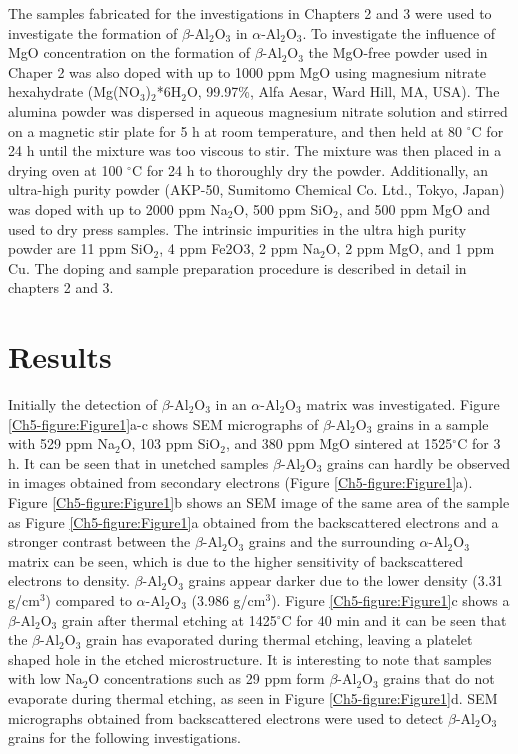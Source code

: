 The samples fabricated for the investigations in Chapters 2 and 3 were used to investigate the formation of $\beta$-Al$_{2}$O$_{3}$ in $\alpha$-Al$_{2}$O$_{3}$. To investigate the influence of MgO concentration on the formation of $\beta$-Al$_{2}$O$_{3}$ the MgO-free powder used in Chaper 2 was also doped with up to 1000 ppm MgO using magnesium nitrate hexahydrate (Mg(NO$_{3}$)$_{2}$*6H$_{2}$O, 99.97\%, Alfa Aesar, Ward Hill, MA, USA). The alumina powder was dispersed in aqueous magnesium nitrate solution and stirred on a magnetic stir plate for 5 h at room temperature, and then held at 80 $^{\circ}$C for 24 h until the mixture was too viscous to stir. The mixture was then placed in a drying oven at 100 $^{\circ}$C for 24 h to thoroughly dry the powder. Additionally, an ultra-high purity powder (AKP-50, Sumitomo Chemical Co. Ltd., Tokyo, Japan) was doped with up to 2000 ppm Na$_{2}$O, 500 ppm SiO$_{2}$, and 500 ppm MgO and used to dry press samples. The intrinsic impurities in the ultra high purity powder are 11 ppm SiO$_{2}$, 4 ppm Fe2O3, 2 ppm Na$_{2}$O, 2 ppm MgO, and 1 ppm Cu. The doping and sample preparation procedure is described in detail in chapters 2 and 3.

\section{Results}

Initially the detection of $\beta$-Al$_{2}$O$_{3}$ in an $\alpha$-Al$_{2}$O$_{3}$ matrix was investigated. Figure \ref{Ch5-figure:Figure1}a-c shows SEM micrographs of $\beta$-Al$_{2}$O$_{3}$ grains in a sample with 529 ppm Na$_{2}$O, 103 ppm SiO$_{2}$, and 380 ppm MgO sintered at 1525$^{\circ}$C for 3 h. It can be seen that in unetched samples $\beta$-Al$_{2}$O$_{3}$ grains can hardly be observed in images obtained from secondary electrons (Figure \ref{Ch5-figure:Figure1}a). Figure \ref{Ch5-figure:Figure1}b shows an SEM image of the same area of the sample as Figure \ref{Ch5-figure:Figure1}a obtained from the backscattered electrons and a stronger contrast between the $\beta$-Al$_{2}$O$_{3}$ grains and the surrounding $\alpha$-Al$_{2}$O$_{3}$ matrix can be seen, which is due to the higher sensitivity of backscattered electrons to density. $\beta$-Al$_{2}$O$_{3}$ grains appear darker due to the lower density (3.31 g/cm$^{3}$) compared to $\alpha$-Al$_{2}$O$_{3}$ (3.986 g/cm$^{3}$). Figure \ref{Ch5-figure:Figure1}c shows a $\beta$-Al$_{2}$O$_{3}$ grain after thermal etching at 1425$^{\circ}$C for 40 min and it can be seen that the $\beta$-Al$_{2}$O$_{3}$ grain has evaporated during thermal etching, leaving a platelet shaped hole in the etched microstructure. It is interesting to note that samples with low Na$_{2}$O concentrations such as 29 ppm form $\beta$-Al$_{2}$O$_{3}$ grains that do not evaporate during thermal etching, as seen in Figure \ref{Ch5-figure:Figure1}d. SEM micrographs obtained from backscattered electrons were used to detect $\beta$-Al$_{2}$O$_{3}$ grains for the following investigations.

